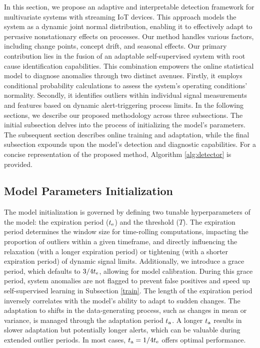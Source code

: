 In this section, we propose an adaptive and interpretable detection framework for multivariate systems with streaming IoT devices. This approach models the system as a dynamic joint normal distribution, enabling it to effectively adapt to pervasive nonstationary effects on processes. Our method handles various factors, including change points, concept drift, and seasonal effects. Our primary contribution lies in the fusion of an adaptable self-supervised system with root cause identification capabilities. This combination empowers the online statistical model to diagnose anomalies through two distinct avenues. Firstly, it employs conditional probability calculations to assess the system's operating conditions' normality. Secondly, it identifies outliers within individual signal measurements and features based on dynamic alert-triggering process limits. In the following sections, we describe our proposed methodology across three subsections. The initial subsection delves into the process of initializing the model's parameters. The subsequent section describes online training and adaptation, while the final subsection expounds upon the model's detection and diagnostic capabilities. For a concise representation of the proposed method, Algorithm \ref{alg:detector} is provided.

\subsection{Model Parameters Initialization}\label{init}
The model initialization is governed by defining two tunable hyperparameters of the model: the expiration period ($t _{\text{e}}$) and the threshold ($T$). The expiration period determines the window size for time-rolling computations, impacting the proportion of outliers within a given timeframe, and directly influencing the relaxation (with a longer expiration period) or tightening (with a shorter expiration period) of dynamic signal limits. Additionally, we introduce a grace period, which defaults to $3/4 t _{\text{e}}$, allowing for model calibration. During this grace period, system anomalies are not flagged to prevent false positives and speed up self-supervised learning in Subsection \ref{train}. The length of the expiration period inversely correlates with the model's ability to adapt to sudden changes. The adaptation to shifts in the data-generating process, such as changes in mean or variance, is managed through the adaptation period $t _{\text{a}}$. A longer $t _{\text{a}}$ results in slower adaptation but potentially longer alerts, which can be valuable during extended outlier periods. In most cases, $t _{\text{a}} = 1/4 t _{\text{e}}$ offers optimal performance.

